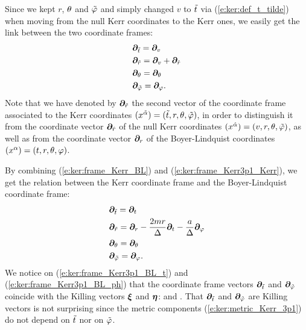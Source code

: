 Since we kept $r$, $\theta$ and ${\tilde\varphi}$ and simply changed
$v$ to ${\tilde t}$ via (\ref{e:ker:def_t_tilde}) when moving from the null Kerr
coordinates to the Kerr ones, we easily get the link
between the two coordinate frames:
\begin{subequations}
\label{e:ker:frame_Kerr3p1_Kerr}
\begin{align}
    & \bm{\partial}_{\tilde t} = \bm{\partial}_v \\
    & \bm{\partial}_{\tilde r} = \bm{\partial}_v + \bm{\partial}_{\hat{r}} \\
    & \bm{\partial}_\theta = \bm{\partial}_\theta \\
    & \bm{\partial}_{\tilde\varphi} = \bm{\partial}_\varphi .
\end{align}
\end{subequations}
Note that we have denoted by $\bm{\partial}_{\tilde r}$ the second vector of the
coordinate frame associated to the Kerr coordinates
$(x^{\tilde{\alpha}}) = ({\tilde t}, r, \theta,{\tilde\varphi})$, in order to distinguish it from
the coordinate vector $\bm{\partial}_{\hat r}$ of the null Kerr coordinates
$(x^{\hat{\alpha}}) = (v, r, \theta,{\tilde\varphi})$, as well as from the coordinate vector
$\bm{\partial}_r$ of the Boyer-Lindquist coordinates
$(x^\alpha) = (t,r,\theta,\varphi)$.

By combining (\ref{e:ker:frame_Kerr_BL}) and (\ref{e:ker:frame_Kerr3p1_Kerr}),
we get the relation between the Kerr coordinate frame and the
Boyer-Lindquist coordinate frame:
\begin{subequations}
\label{e:ker:frame_Kerr3p1_BL}
\begin{align}
    & \bm{\partial}_{\tilde t} = \bm{\partial}_t \label{e:ker:frame_Kerr3p1_BL_t} \\
    & \bm{\partial}_{\tilde r} = \bm{\partial}_r - \frac{2mr}{\Delta} \bm{\partial}_t
                        - \frac{a}{\Delta} \bm{\partial}_\varphi \\
    & \bm{\partial}_\theta = \bm{\partial}_\theta \\
    & \bm{\partial}_{{\tilde\varphi}} = \bm{\partial}_\varphi . \label{e:ker:frame_Kerr3p1_BL_ph}
\end{align}
\end{subequations}
We notice on (\ref{e:ker:frame_Kerr3p1_BL_t}) and (\ref{e:ker:frame_Kerr3p1_BL_ph})
that the coordinate frame vectors $\bm{\partial}_{\tilde t}$ and $\bm{\partial}_{\tilde\varphi}$
coincide with the Killing vectors $\bm{\xi}$ and $\bm{\eta}$:
\be \label{e:ker:Killing_vec_3p1}
    \encadre{\wpar_\ti = \w{\xi}} \quad \mbox{and} \quad
    \encadre{\wpar_\tph = \w{\eta}} .
\ee
That $\bm{\partial}_{\tilde t}$ and $\bm{\partial}_{\tilde\varphi}$ are Killing vectors is not surprising since
the metric components (\ref{e:ker:metric_Kerr_3p1}) do not depend on ${\tilde t}$
nor on ${\tilde\varphi}$.

